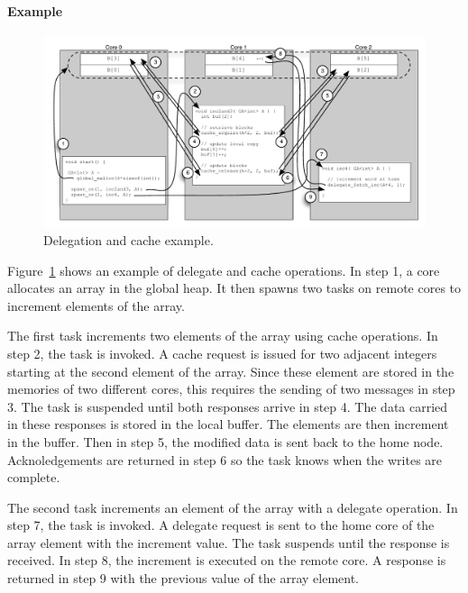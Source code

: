 \paragraph{Example}

\begin{figure}[htb]
\begin{center}
  \includegraphics[width=1.5\columnwidth]{figs/delegate-cache}
\begin{minipage}{1.5\columnwidth}
  \caption{\label{fig:delegate-cache} Delegation and cache example.}
\end{minipage}
\vspace{-3ex}
\end{center}
\end{figure}

Figure~\ref{fig:delegate-cache} shows an example of delegate and cache
operations. In step 1, a core allocates an array in the global
heap. It then spawns two tasks on remote cores to increment elements
of the array.

The first task increments two elements of the array using cache
operations. In step 2, the task is invoked. A cache request is issued
for two adjacent integers starting at the second element of the
array. Since these element are stored in the memories of two different
cores, this requires the sending of two messages in step 3. The task
is suspended until both responses arrive in step 4. The data carried
in these responses is stored in the local buffer. The elements are
then increment in the buffer. Then in step 5, the modified data is
sent back to the home node. Acknoledgements are returned in step 6 so
the task knows when the writes are complete.

The second task increments an element of the array with a delegate
operation. In step 7, the task is invoked. A delegate request is sent
to the home core of the array element with the increment value. The
task suspends until the response is received. In step 8, the increment
is executed on the remote core. A response is returned in step 9 with
the previous value of the array element.



